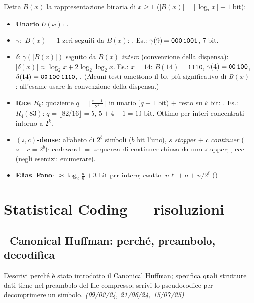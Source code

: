 Detta $B(x)$ la rappresentazione binaria di $x\ge1$ ($|B(x)|=\lfloor\log_2 x\rfloor+1$ bit):
\begin{itemize}[leftmargin=1.6em,itemsep=2pt]
\item \textbf{Unario} $U(x)$: .
\item \textbf{$\gamma$}: $|B(x)|-1$ zeri seguiti da $B(x)$:
. Es.: $\gamma(9)=\texttt{000\,1001}$, 7 bit.
\item \textbf{$\delta$}: $\gamma(|B(x)|)$ seguito da $B(x)$ \emph{intero} (convenzione della
dispensa): $|\delta(x)|\approx\log_2x+2\log_2\log_2x$.
Es.: $x=14$: $B(14)=\texttt{1110}$, $\gamma(4)=\texttt{00\,100}$,
$\delta(14)=\texttt{00\,100\,1110}$, . (Alcuni testi omettono il bit pi\`u
significativo di $B(x)$: all'esame usare la convenzione della dispensa.)
\item \textbf{Rice $R_k$}: quoziente $q=\bigl\lfloor\frac{x-1}{2^{k}}\bigr\rfloor$ in unario
($q+1$ bit) $+$ resto su $k$ bit: .
Es.: $R_4(83)$: $q=\lfloor82/16\rfloor=5$, $5+4+1=10$ bit. Ottimo per interi concentrati intorno
a $2^{k}$.
\item \textbf{$(s,c)$-dense}: alfabeto di $2^{b}$ simboli ($b$ bit l'uno), $s$ \emph{stopper} $+$
$c$ \emph{continuer} ($s+c=2^{b}$): codeword $=$ sequenza di continuer chiusa da uno stopper;
, ecc. (negli esercizi: enumerare).
\item \textbf{Elias--Fano}: $\approx\log_2\frac{u}{n}+3$ bit per intero; esatto:
$n\ell+n+u/2^{\ell}$ ().
\end{itemize}

\section{Statistical Coding --- risoluzioni}

\subsection*{\hot\ Canonical Huffman: perch\'e, preambolo, decodifica}

\begin{domanda}
Descrivi perch\'e \`e stato introdotto il Canonical Huffman; specifica quali strutture dati tiene
nel preambolo del file compresso; scrivi lo pseudocodice per decomprimere un simbolo.
\emph{(09/02/24, 21/06/24, 15/07/25)}
\end{domanda}


